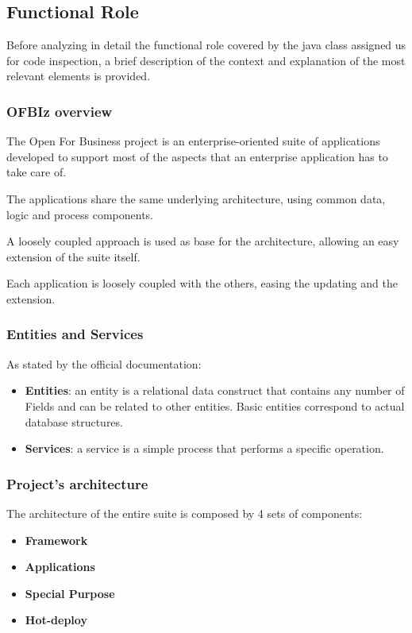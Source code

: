 \subsection{Functional Role}

Before analyzing in detail the functional role covered by the java class assigned us for code inspection, a brief description of the context and explanation of the most relevant elements is provided.  

\subsubsection{OFBIz overview}
The Open For Business project is an enterprise-oriented suite of applications developed to support most of the aspects that an enterprise application has to take care of.

The applications share the same underlying architecture, using common data, logic and process components.

A loosely coupled approach is used as base for the architecture, allowing an easy extension of the suite itself.

Each application is loosely coupled with the others, easing the updating and the extension.

\subsubsection{Entities and Services}
As stated by the official documentation:

\begin{itemize}
	\item \textbf{Entities}: an entity is a relational data construct that contains any number of Fields and can be related to other entities. Basic entities correspond to actual database structures.
	\item \textbf{Services}: a service is a simple process that performs a specific operation.
\end{itemize}

\subsubsection{Project's architecture}

The architecture of the entire suite is composed by 4 sets of components:

\begin{itemize}
	\item \textbf{Framework}
	\item \textbf{Applications}
	\item \textbf{Special Purpose}
	\item \textbf{Hot-deploy}
\end{itemize}

